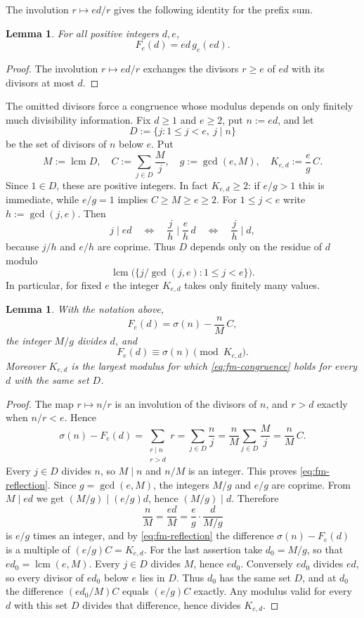 \documentclass[11pt,letterpaper,reqno]{amsart}
\numberwithin{equation}{section}
\newtheorem{lemma}[theorem]{Lemma}
\theoremstyle{remark}
\DeclareMathOperator{\lcm}{lcm}
\renewcommand{\leq}{\leqslant}
\renewcommand{\geq}{\geqslant}
\begin{document}
The involution $r\mapsto ed/r$ gives the following identity for the prefix sum.

\begin{lemma}
For all positive integers $d,e$,
\begin{equation}\label{eq:reflection}
 F_e(d)=ed\,g_e(ed).
\end{equation}
\end{lemma}
\begin{proof}
The involution $r\mapsto ed/r$ exchanges the divisors $r\geq e$ of $ed$
with its divisors at most $d$.
\end{proof}

The omitted divisors force a congruence whose modulus depends on only
finitely much divisibility information. Fix $d\geq1$ and $e\geq2$, put $n:=ed$, and let
\[
 D:=\{j:1\leq j<e,\ j\mid n\}
\]
be the set of divisors of $n$ below $e$. Put
\[
 M:=\lcm D,\quad C:=\sum_{j\in D}\frac Mj,\quad g:=\gcd(e,M),\quad
 K_{e,d}:=\frac eg\,C .
\]
Since $1\in D$, these are positive integers. In fact $K_{e,d}\geq2$: if $e/g>1$ this is immediate, while $e/g=1$ implies $C\geq M\geq e\geq2$. For $1\leq j<e$ write
$h:=\gcd(j,e)$. Then
\[
 j\mid ed\quad\Longleftrightarrow\quad \frac jh\mid\frac eh\,d
 \quad\Longleftrightarrow\quad \frac jh\mid d,
\]
because $j/h$ and $e/h$ are coprime. Thus $D$ depends only on the residue
of $d$ modulo
\[
 \lcm\bigl(\{j/\gcd(j,e):1\leq j<e\}\bigr).
\]
In particular, for fixed $e$ the integer $K_{e,d}$ takes only finitely many
values.
\begin{lemma}\label{lem:fm-modulus}
With the notation above,
\begin{equation}\label{eq:fm-reflection}
 F_e(d)=\sigma(n)-\frac nM\,C ,
\end{equation}
the integer $M/g$ divides $d$, and
\begin{equation}\label{eq:fm-congruence}
 F_e(d)\equiv\sigma(n)\pmod{K_{e,d}} .
\end{equation}
Moreover $K_{e,d}$ is the largest modulus for which
\eqref{eq:fm-congruence} holds for every $d$ with the same set $D$.
\end{lemma}
\begin{proof}
The map $r\mapsto n/r$ is an involution of the divisors of $n$, and $r>d$
exactly when $n/r<e$. Hence
\[
 \sigma(n)-F_e(d)=\sum_{\substack{r\mid n\\ r>d}}r
 =\sum_{j\in D}\frac nj=\frac nM\sum_{j\in D}\frac Mj=\frac nM\,C .
\]
Every $j\in D$ divides $n$, so $M\mid n$ and $n/M$ is an integer. This
proves \eqref{eq:fm-reflection}.
Since $g=\gcd(e,M)$, the integers $M/g$ and $e/g$ are coprime. From
$M\mid ed$ we get $(M/g)\mid(e/g)d$, hence $(M/g)\mid d$. Therefore
\[
 \frac nM=\frac{ed}M=\frac eg\cdot\frac d{M/g}
\]
is $e/g$ times an integer, and by \eqref{eq:fm-reflection} the difference
$\sigma(n)-F_e(d)$ is a multiple of $(e/g)C=K_{e,d}$.
For the last assertion take $d_0=M/g$, so that $ed_0=\lcm(e,M)$. Every
$j\in D$ divides $M$, hence $ed_0$. Conversely $ed_0$ divides $ed$, so
every divisor of $ed_0$ below $e$ lies in $D$. Thus $d_0$ has the same set
$D$, and at $d_0$ the difference $(ed_0/M)C$ equals $(e/g)C$ exactly. Any
modulus valid for every $d$ with this set $D$ divides that difference,
hence divides $K_{e,d}$.
\end{proof}
\end{document}
